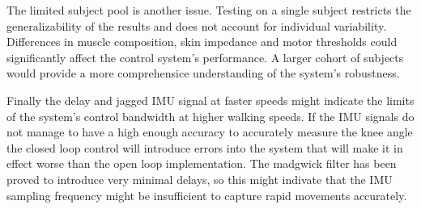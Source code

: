 The limited subject pool is another issue. Testing on a single subject restricts the generalizability of the results and does not account for individual variability. Differences in muscle composition, skin impedance and motor thresholds could significantly affect the control system's performance. A larger cohort of subjects would provide a more comprehensice understanding of the system's robustness.

Finally the delay and jagged IMU signal at faster speeds might indicate the limits of the system's control bandwidth at higher walking speeds. If the IMU signals do not manage to have a high enough accuracy to accurately measure the knee angle the closed loop control will introduce errors into the system that will make it in effect worse than the open loop implementation. The madgwick filter has been proved to introduce very minimal delays, so this might indivate that the IMU sampling frequency might be insufficient to capture rapid movements accurately. 


